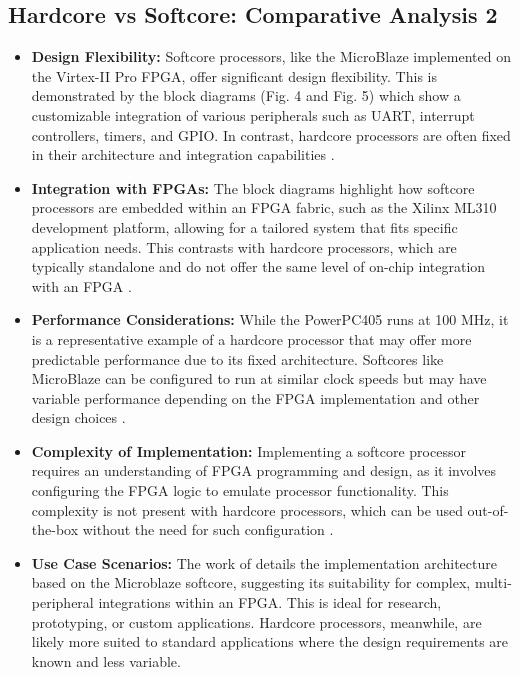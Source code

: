 \documentclass[conference]{IEEEtran}
\begin{document}
\subsection{\textbf{Hardcore vs Softcore: Comparative Analysis 2}}
\begin{itemize}
\item \textbf{Design Flexibility:} Softcore processors, like the MicroBlaze implemented on the Virtex-II Pro FPGA, offer significant design flexibility. This is demonstrated by the block diagrams (Fig. 4 and Fig. 5) which show a customizable integration of various peripherals such as UART, interrupt controllers, timers, and GPIO. In contrast, hardcore processors are often fixed in their architecture and integration capabilities \cite{1}.

\item \textbf{Integration with FPGAs:} The block diagrams highlight how softcore processors are embedded within an FPGA fabric, such as the Xilinx ML310 development platform, allowing for a tailored system that fits specific application needs. This contrasts with hardcore processors, which are typically standalone and do not offer the same level of on-chip integration with an FPGA \cite{1}.

\item \textbf{Performance Considerations:} While the PowerPC405 runs at 100 MHz, it is a representative example of a hardcore processor that may offer more predictable performance due to its fixed architecture. Softcores like MicroBlaze can be configured to run at similar clock speeds but may have variable performance depending on the FPGA implementation and other design choices \cite{1}.

\item \textbf{Complexity of Implementation:} Implementing a softcore processor requires an understanding of FPGA programming and design, as it involves configuring the FPGA logic to emulate processor functionality. This complexity is not present with hardcore processors, which can be used out-of-the-box without the need for such configuration \cite{1}.

\item \textbf{Use Case Scenarios:} The work of \cite{1} details the implementation architecture based on the Microblaze softcore, suggesting its suitability for complex, multi-peripheral integrations within an FPGA. This is ideal for research, prototyping, or custom applications. Hardcore processors, meanwhile, are likely more suited to standard applications where the design requirements are known and less variable.
\end{itemize}
\end{document}

